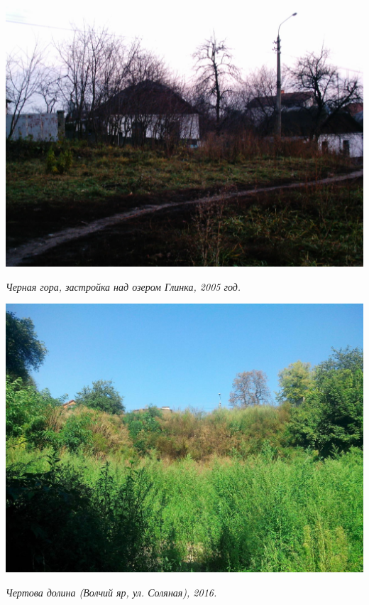 \begin{center}
\includegraphics[width=0.95\linewidth]{rpix/imag0031.jpg}


\textit{Черная гора, застройка над озером Глинка, 2005 год.}
\end{center}


\begin{center}
\includegraphics[width=0.90\linewidth]{rpix/IMG_20160828_145726.jpg}

\textit{Чертова долина (Волчий яр, ул. Соляная), 2016.}
\end{center}

